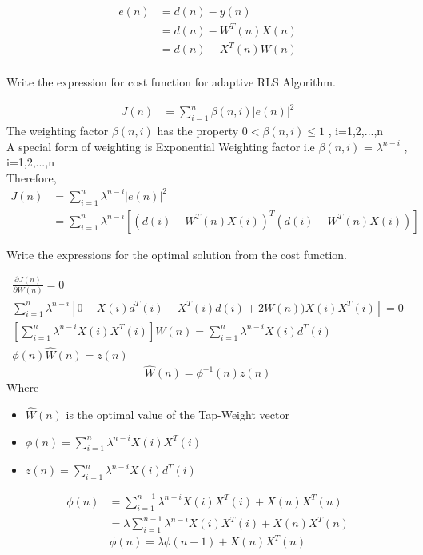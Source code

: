\documentclass[journal,12pt,twocolumn]{IEEEtran}
\begin{document}
\solution
\begin{align*}
e(n)&=d(n) - y(n)\\
&=d(n) - W^{T}(n) X(n)\\
&=d(n) - X^{T}(n)W(n)\\
\end{align*}
\begin{problem}
Write the expression for cost function for adaptive RLS Algorithm. \label{prob2}
\end{problem}
\solution
\begin{align*}
J(n) &= \sum_{i=1}^{n} \beta (n,i) |e(n)|^2
\end{align*}
The weighting factor $\beta (n,i)$ has the property $0<\beta (n,i)\leq 1$ ,   i=1,2,...,n\\
A special form of weighting is Exponential Weighting factor i.e $\beta (n,i)$ = $\lambda ^{n-i}$ ,  i=1,2,...,n\\
Therefore,
\begin{align*}
J(n) &=\sum_{i=1}^{n} \lambda ^{n-i} |e(n)|^2 \\
&=\sum_{i=1}^{n} \lambda ^{n-i}[(d(i) - W^{T}(n)X(i))^{T}(d(i) - W^{T}(n)X(i))]
\end{align*}
\begin{problem}
Write the expressions for the optimal solution from the cost function.
\end{problem}
\solution
\begin{align*}
\frac{\partial J(n)}{\partial W(n)}=0\\
\sum_{i=1}^{n} \lambda ^{n-i}[0 - X(i)d^{T}(i)-X^{T}(i)d(i)+2W(n))X(i)X^{T}(i)]=0\\
[\sum_{i=1}^{n} \lambda ^{n-i}X(i)X^{T}(i)]W(n)=\sum_{i=1}^{n} \lambda ^{n-i}X(i)d^{T}(i)\\
\phi (n) \hat W(n) =z(n)
\end{align*}
\begin{equation}
\hat W(n) =\phi ^{-1} (n) z(n)
\end{equation}
Where 
\begin{itemize}
\item $\hat W(n)$ is the optimal value of the Tap-Weight vector
\item $\phi (n) = \sum_{i=1}^{n} \lambda ^{n-i}X(i)X^{T}(i)$
\item $z(n) = \sum_{i=1}^{n} \lambda ^{n-i}X(i)d^{T}(i)$
\end{itemize}
\begin{align*}
\phi (n) &= \sum_{i=1}^{n-1} \lambda ^{n-i}X(i)X^{T}(i)+X(n)X^{T}(n)\\
&=\lambda \sum_{i=1}^{n-1} \lambda ^{n-i}X(i)X^{T}(i)+X(n)X^{T}(n)
\end{align*}
\begin{equation}
\phi (n)=\lambda \phi (n-1) + X(n)X^{T}(n)
\end{equation}
\end{document}
